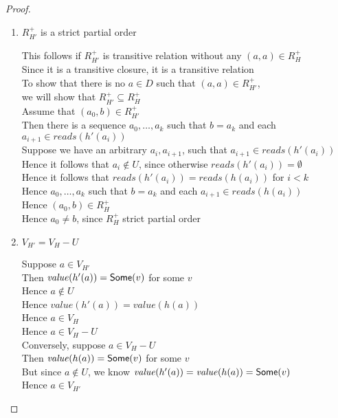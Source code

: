 \begin{proof}
\begin{enumerate}
\item $R^+_{H'}$ is a strict partial order 
  \begin{tabbedproof}
    \oo This follows if $R^+_{H'}$ is transitive relation without any $(a,a) \in R^+_H$ \\
    \oo Since it is a transitive closure, it is a transitive relation \\
    \oo To show that there is no $a \in D$ such that $(a,a) \in R^+_{H'}$, \\
    \ox we will show that $R^+_{H'} \subseteq R^+_H$ \\
    \oo Assume that $(a_0,b) \in R^+_{H'}$ \\
    \oo Then there is a sequence $a_0, \ldots, a_k$ such that $b = a_k$ and each $a_{i+1} \in \mathit{reads}(h'(a_i))$ \\
    \oo Suppose we have an arbitrary $a_i, a_{i+1}$, such that $a_{i+1} \in \mathit{reads}(h'(a_i))$ \\
    \oo Hence it follows that $a_i \not\in U$, since otherwise $\mathit{reads}(h'(a_i)) = \emptyset$ \\
    \oo Hence it follows that $\mathit{reads}(h'(a_i)) = \mathit{reads}(h(a_i))$ for $i < k$ \\
    \oo Hence $a_0, \ldots, a_k$ such that $b = a_k$ and each $a_{i+1} \in \mathit{reads}(h(a_i))$ \\
    \oo Hence $(a_0, b) \in R^+_H$ \\
    \oo Hence $a_0 \not= b$, since $R^+_H$ strict partial order 
  \end{tabbedproof}

\item $V_{H'} = V_H - U$
  \begin{tabbedproof}
    \oo Suppose $a \in V_{H'}$ \\
    \ooo Then $\mathit{value}(h'(a)) = \mathsf{Some}(v)$ for some $v$ \\
    \ooo Hence $a \not\in U$ \\
    \ooo Hence $\mathit{value}(h'(a)) = \mathit{value}(h(a))$  \\
    \ooo Hence $a \in V_H$ \\
    \ooo Hence $a \in V_{H} - U$ \\
    \oo Conversely, suppose $a \in V_{H} - U$ \\
    \ooo Then $\mathit{value}(h(a)) = \mathsf{Some}(v)$ for some $v$ \\
    \ooo But since $a \not\in U$, we know $\mathit{value}(h'(a)) = \mathit{value}(h(a)) = \mathsf{Some}(v)$ \\
    \ooo Hence $a \in V_{H'}$ 
  \end{tabbedproof}


\end{enumerate}
\end{proof}
